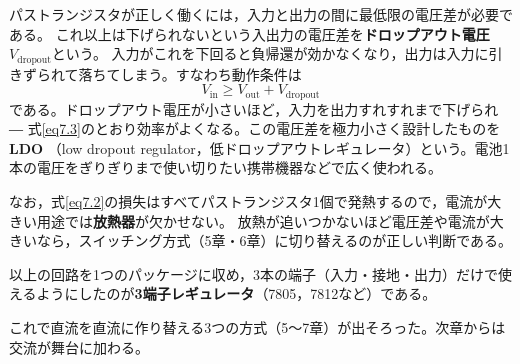 パストランジスタが正しく働くには，入力と出力の間に最低限の電圧差が必要である。
これ以上は下げられないという入出力の電圧差を\textbf{ドロップアウト電圧}$V_{\mathrm{dropout}}$という。
入力がこれを下回ると負帰還が効かなくなり，出力は入力に引きずられて落ちてしまう。すなわち動作条件は
\begin{equation}
V_{\mathrm{in}} \geq V_{\mathrm{out}} + V_{\mathrm{dropout}}
\label{eq7.11}
\end{equation}
である。ドロップアウト電圧が小さいほど，入力を出力すれすれまで下げられ ―
式\ref{eq7.3}のとおり効率がよくなる。この電圧差を極力小さく設計したものを\textbf{LDO}
（low dropout regulator，低ドロップアウトレギュレータ）という。電池1本の電圧をぎりぎりまで使い切りたい携帯機器などで広く使われる。

なお，式\ref{eq7.2}の損失はすべてパストランジスタ1個で発熱するので，電流が大きい用途では\textbf{放熱器}が欠かせない。
放熱が追いつかないほど電圧差や電流が大きいなら，スイッチング方式（5章・6章）に切り替えるのが正しい判断である。

以上の回路を1つのパッケージに収め，3本の端子（入力・接地・出力）だけで使えるようにしたのが\textbf{3端子レギュレータ}（7805，7812など）である。

これで直流を直流に作り替える3つの方式（5〜7章）が出そろった。次章からは交流が舞台に加わる。

